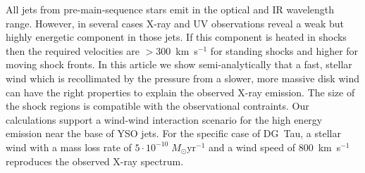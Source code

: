 All jets from pre-main-sequence stars emit in the optical and IR wavelength range. However, in several cases X-ray and UV observations reveal a weak but highly energetic component in those jets. If this component is heated in shocks then the required velocities are $>$300~km~s$^{-1}$ for standing shocks and higher for moving shock fronts. In this article we show semi-analytically that a fast, stellar wind which is recollimated by the pressure from a slower, more massive disk wind can have the right properties to explain the observed X-ray emission. The size of the shock regions is compatible with the observational contraints. Our calculations support a wind-wind interaction scenario for the high energy emission near the base of YSO jets. 
For the specific case of DG~Tau, a stellar wind with a mass loss rate of $5\cdot10^{-10}\;M_{\odot}\mathrm{ yr}^{-1}$ and a wind speed of 800~km~s$^{-1}$ reproduces the observed X-ray spectrum.
